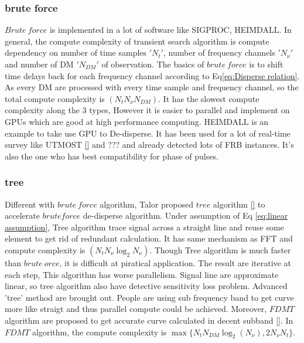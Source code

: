 \documentclass[iop]{emulateapj}
\begin{document}
\subsubsection*{brute force}
$Brute~force$ is implemented in a lot of software like SIGPROC, HEIMDALL. In general, the compute complexity of transient search algorithm is compute dependency on number of time samples $'N_t'$, number of frequency channels $'N_{\nu}'$ and number of DM $'N_{DM}'$ of observation. The basics of $brute~force$ is to shift time delays back for each frequency channel according to Eq\ref{eq:Disperse relation}. As every DM are processed with every time sample and frequency channel, so the total compute complexity is $(N_t N_{\nu} N_{DM})$. It has the slowest compute complexity along the 3 types, However it is easier to parallel and implement on GPUs which are good at high performance computing. HEIMDALL is an example to take use GPU to De-disperse. It has been used for a lot of real-time survey like UTMOST \ref{} and ??? and already detected lots of FRB instances. It's also the one who has best compatibility for phase of pulses.   \\

\subsubsection*{tree}
Different with $brute~force$ algorithm, Talor proposed $tree$ algorithm \ref{} to accelerate $brute force$ de-disperse algorithm. Under assumption of Eq \ref{eq:linear assumption}, Tree algorithm trace signal across a straight line and reuse some element to get rid of redundant calculation. It has same mechanism as FFT and compute complexity is $(N_t N_{\nu} \log_2{N_{\nu}})$.	Though Tree algorithm is much faster than $brute~orce$, it is difficult at piratical application. The result are iterative at each step, This algorithm has worse  parallelism. Signal line are approximate linear, so tree algorithm also have detective sensitivity loss problem. Advanced 'tree' method are brought out. People are using sub frequency band to get curve more like straigt and thus parallel compute could be achieved. Moreover, $FDMT$ algorithm are proposed to get accurate curve calculated in decent subband \ref{}. In $FDMT$ algorithm, the compute complexity is $\max \{N_tN_{DM}\log_2(N_{\nu}),2N_{\nu}N_t\}$.\\
\end{document}

